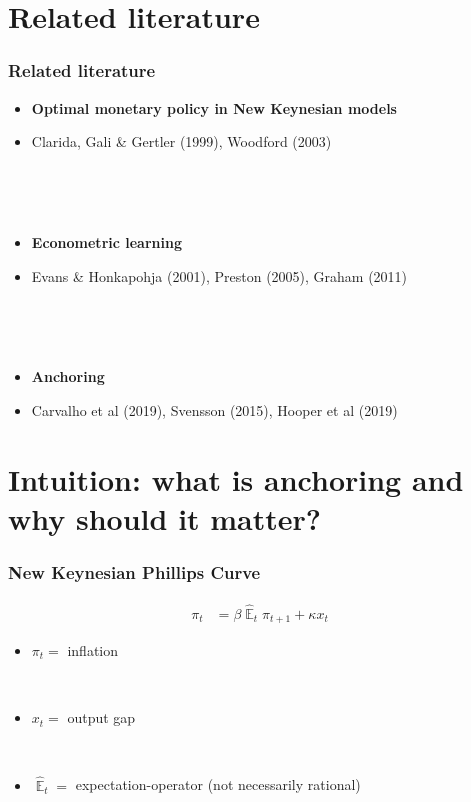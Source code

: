 \documentclass{beamer}
\DeclareMathOperator{\E}{\mathbb{E}}
\begin{document}
\section{Related literature}
\begin{frame}
	\frametitle{Related literature}

\begin{itemize}
\item \textbf{Optimal monetary policy in New Keynesian models}
\item[] Clarida, Gali \& Gertler (1999), Woodford (2003)

\

\

\item \textbf{Econometric learning}
\item[] Evans \& Honkapohja (2001), Preston (2005), Graham (2011)

\

\

\item \textbf{Anchoring} 
\item[] Carvalho et al (2019), Svensson (2015), Hooper et al (2019)
\end{itemize}



\end{frame}

\section{Intuition: what is anchoring and why should it matter?}
\begin{frame}
	\frametitle{New Keynesian Phillips Curve}

\begin{align*}
\pi_t & = \beta \hat{\E}_t\pi_{t+1} + \kappa x_t
\end{align*}

\begin{itemize}
\item $\pi_t = $ inflation

\

\item $x_t =$ output gap

\

\item $\hat{\E}_t =$ expectation-operator (not necessarily rational)


\end{itemize}



\end{frame}
\end{document}
